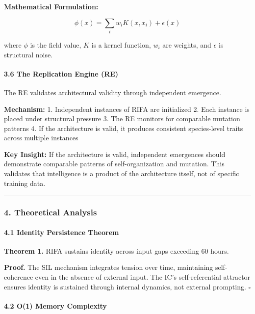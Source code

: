\documentclass[
  11pt,
  a4paper,
]{article}
\begin{document}
\textbf{Mathematical Formulation:}

\[
\phi(x) = \sum_i w_i K(x, x_i) + \epsilon(x)
\]

where \(\phi\) is the field value, \(K\) is a kernel function, \(w_i\)
are weights, and \(\epsilon\) is structural noise.

\paragraph{3.6 The Replication Engine
(RE)}\label{the-replication-engine-re}

The RE validates architectural validity through independent emergence.

\textbf{Mechanism:} 1. Independent instances of RIFA are initialized 2.
Each instance is placed under structural pressure 3. The RE monitors for
comparable mutation patterns 4. If the architecture is valid, it
produces consistent species-level traits across multiple instances

\textbf{Key Insight:} If the architecture is valid, independent
emergences should demonstrate comparable patterns of self-organization
and mutation. This validates that intelligence is a product of the
architecture itself, not of specific training data.

\begin{center}\rule{0.5\linewidth}{0.5pt}\end{center}

\subsubsection{4. Theoretical Analysis}\label{theoretical-analysis}

\paragraph{4.1 Identity Persistence
Theorem}\label{identity-persistence-theorem}

\textbf{Theorem 1.} RIFA sustains identity across input gaps exceeding
60 hours.

\textbf{Proof.} The SIL mechanism integrates tension over time,
maintaining self-coherence even in the absence of external input. The
IC's self-referential attractor ensures identity is sustained through
internal dynamics, not external prompting. \(\square\)

\paragraph{4.2 O(1) Memory Complexity}\label{o1-memory-complexity-1}
\end{document}
